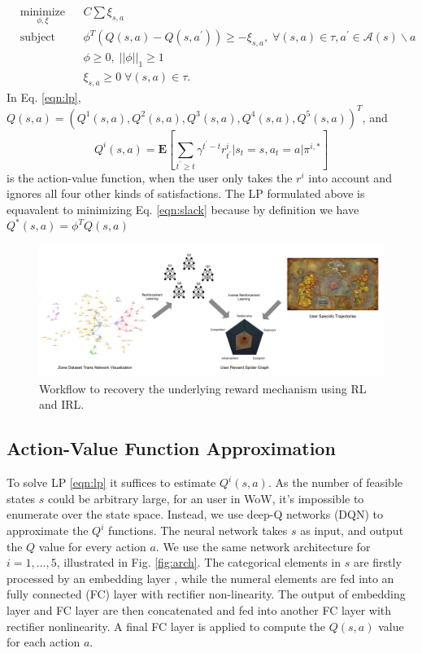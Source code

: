 \documentclass{sigchi}
\begin{document}
\begin{equation}
\begin{aligned}
& \underset{\phi, \xi}{\text{minimize}}
& & C\sum \xi_{s,a} \\
& \text{subject to}
& & \phi^T(Q(s,a)-Q(s,a^\prime)) \geq - \xi_{s,a}, \; \forall (s,a) \in \tau, a^\prime \in \mathcal{A}(s)\backslash a \\
&&& \phi \geq 0, \; ||\phi||_1\geq 1\\
&&& \xi_{s,a} \geq 0 \; \forall (s,a) \in \tau. 
\label{eqn:lp}
\end{aligned}
\end{equation}
In Eq. \eqref{eqn:lp}, $Q(s,a)=(Q^1(s,a), Q^2(s,a), Q^3(s,a), Q^4(s,a), Q^5(s,a))^T$, and
\begin{equation}
Q^i(s,a)=\mathbf{E}[\sum_{t^\prime\geq t}\gamma^{t^\prime-t}r^i_{t^\prime} | s_{t}=s, a_{t}=a | \pi^{i,\ast}] \label{eqn:qi}
\end{equation}
is the action-value function, when the user only takes the $r^i$ into account and ignores all four other kinds of satisfactions. The LP formulated above is equavalent to minimizing Eq. \eqref{eqn:slack} because by definition we have $Q^*(s,a)=\phi^TQ(s,a)$

\begin{figure}[t]
  \centering
  \includegraphics[width=\textwidth]{figs/workflow.png}
  \caption{Workflow to recovery the underlying reward mechanism using RL and IRL.}
  \label{fig:workflow}
\end{figure}

\subsection{Action-Value Function Approximation}

To solve LP \eqref{eqn:lp} it suffices to estimate $Q^i(s,a)$. As the number of feasible states $s$ could be arbitrary large, for an user in WoW, it's impossible to enumerate over the state space. Instead, we use deep-Q networks (DQN) \cite{mnih2015human} to approximate the $Q^i$ functions. The neural network takes $s$ as input, and output the $Q$ value for every action $a$. We use the same network architecture for $i=1,\dots,5$, illustrated in Fig. \ref{fig:arch}. The categorical elements in $s$ are firstly processed by an embedding layer \cite{mikolov2013distributed}, while the numeral elements are fed into an fully connected (FC) layer with rectifier non-linearity. The output of embedding layer and FC layer are then concatenated and fed into another FC layer with rectifier nonlinearity. A final FC layer is applied to compute the $Q(s,a)$ value for each action $a$.
\end{document}
